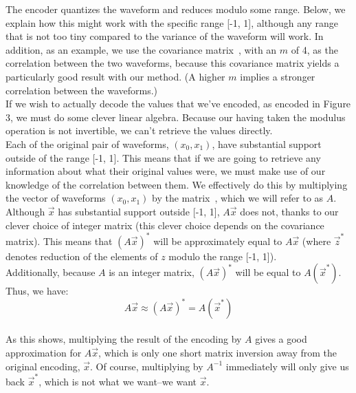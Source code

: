 \documentclass{amsart}
\begin{document}
The encoder quantizes the waveform and reduces modulo some range. Below, we explain how this might work with the specific range [-1, 1], although any range that is not too tiny compared to the variance of the waveform will work. In addition, as an example, we use the covariance matrix~\usebox{\covmat}, with an $m$ of 4, as the correlation between the two waveforms, because this covariance matrix yields a particularly good result with our method. (A higher $m$ implies a stronger correlation between the waveforms.) \\

If we wish to actually decode the values that we've encoded, as encoded in Figure 3, we must do some clever linear algebra. Because our having taken the modulus operation is not invertible, we can't retrieve the values directly.\\

Each of the original pair of waveforms, $(x_0, x_1)$, have substantial support outside of the range [-1, 1]. This means that if we are going to retrieve any information about what their original values were, we must make use of our knowledge of the correlation between them. We effectively do this by multiplying the vector of waveforms $(x_0, x_1)$ by the matrix~\usebox{\intmat}, which we will refer to as $A$. \\

Although $\vec{x}$ has substantial support outside [-1, 1], $A\vec{x}$ does not, thanks to our clever choice of integer matrix (this clever choice depends on the covariance matrix). This means that $(A\vec{x})^*$ will be approximately equal to $A\vec{x}$ (where $\vec{z}^*$ denotes reduction of the elements of $z$ modulo the range [-1, 1]). \\

Additionally, because $A$ is an integer matrix, $(A\vec{x})^*$ will be equal to $A(\vec{x}^*)$. \\

Thus, we have: \\

$$A\vec{x} \approx (A\vec{x})^* = A(\vec{x}^*)$$ \\

As this shows, multiplying the result of the encoding by $A$ gives a good approximation for $A\vec{x}$, which is only one short matrix inversion away from the original encoding, $\vec{x}$. Of course, multiplying by $A^{-1}$ immediately will only give us back $\vec{x}^*$, which is not what we want--we want $\vec{x}$. \\
\end{document}
